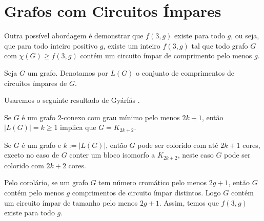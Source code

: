 \chapter{Grafos com Circuitos Ímpares}
\label{cap:circimpares}
Outra possível abordagem é demonstrar que $f(3,g)$ existe para todo $g$, ou seja, que para todo inteiro positivo $g$, existe um inteiro $f(3,g)$ tal que todo grafo $G$ com $\chi(G)\geq f(3,g)$ contém um circuito ímpar de comprimento pelo menos $g$.

\begin{definicao}
Seja $G$ um grafo. Denotamos por $L(G)$ o conjunto de comprimentos de circuitos ímpares de $G$.
\end{definicao}

Usaremos o seguinte resultado de Gyárfás \cite{gyarfas1992graphs}.

\begin{teorema}\label{gyarfasthm}
Se $G$ é um grafo $2$-conexo com grau mínimo pelo menos $2k+1$, então $|L(G)|=k\geq1$ implica que $G = K_{2k+2}$.
\end{teorema}

\begin{corolario}\label{gyarfascor}
Se $G$ é um grafo e $k := |L(G)|$, então $G$ pode ser colorido com até $2k+1$ cores, exceto no caso de $G$ conter um bloco isomorfo a $K_{2k+2}$, neste caso $G$ pode ser colorido com $2k+2$ cores.
\end{corolario}

Pelo corolário, se um grafo $G$ tem número cromático pelo menos $2g+1$, então $G$ contém pelo menos $g$ comprimentos de circuito ímpar distintos. Logo $G$ contém um circuito ímpar de tamanho pelo menos $2g+1$. Assim, temos que $f(3,g)$ existe para todo $g$.

